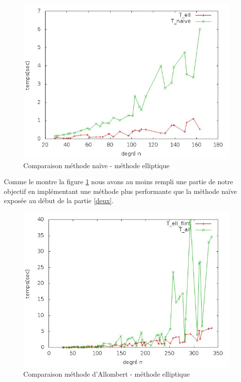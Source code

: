 \documentclass[a4paper]{article} %
\numberwithin{section}{part}
\numberwithin{equation}{section}
\begin{document}
\begin{figure}[H]
\centering
\includegraphics[scale=0.6]{data_test12_cmpellFFH1}
\caption{Comparaison méthode naïve - méthode elliptique}
\label{fig:ellvsnaive}
\end{figure}

Comme le montre la figure \ref{fig:ellvsnaive} nous avons au moins rempli une
partie de notre objectif en implémentant une méthode plus performante que la
méthode naïve exposée au début de la partie \ref{deux}.

\begin{figure}[H]
\centering
\includegraphics[scale=0.6]{data_test14_cmpellFFH3}
\caption{Comparaison méthode d'Allombert - méthode elliptique}
\label{fig:ellvsallom}
\end{figure}
\end{document}
